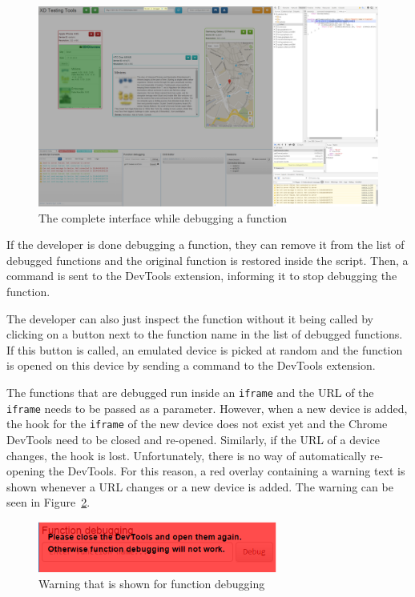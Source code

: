 \begin{figure}[H]
  \centering
    \includegraphics[width=1.0\textwidth]{images/screenshots/function_debugging_complete.png}
	\caption[Screenshot: Function debugging]{The complete interface while debugging a function}
	\label{fig:function_debugging_complete}
\end{figure}

If the developer is done debugging a function, they can remove it from the list of debugged functions and the original function is restored inside the script. Then, a command is sent to the DevTools extension, informing it to stop debugging the function. 

The developer can also just inspect the function without it being called by clicking on a button next to the function name in the list of debugged functions. If this button is called, an emulated device is picked at random and the function is opened on this device by sending a command to the DevTools extension. 

The functions that are debugged run inside an \lstinline|iframe| and the URL of the \lstinline|iframe| needs to be passed as a parameter. However, when a new device is added, the hook for the \lstinline|iframe| of the new device does not exist yet and the Chrome DevTools need to be closed and re-opened. Similarly, if the URL of a device changes, the hook is lost. Unfortunately, there is no way of automatically re-opening the DevTools. For this reason, a red overlay containing a warning text is shown whenever a URL changes or a new device is added. The warning can be seen in Figure~\ref{fig:warning}.

\begin{figure}[H]
  \centering
    \includegraphics[width=0.7\textwidth]{images/screenshots/warning.png}
	\caption[Screenshot: Function debugging warning]{Warning that is shown for function debugging}
	\label{fig:warning}
\end{figure}

